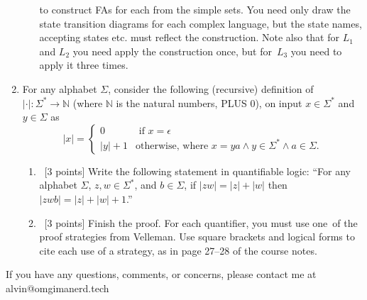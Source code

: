 \documentclass[letterpaper, 12pt]{math}
\begin{document}
\begin{enumerate}
\begin{enumerate}
    to construct FAs for each from the simple sets. You need only draw the
    state transition diagrams for each complex language, but the state names,
    accepting states etc. must reflect the construction. Note also that for
    \( L_1 \) and \( L_2 \) you need apply the construction once, but for\
    \( L_3 \) you need to apply it three times.
  \end{enumerate}
  \item For any alphabet $\Sigma$, consider the following (recursive)
  definition of $|\cdot|: \Sigma^* \rightarrow \mathbb{N}$ (where $\mathbb{N}$
  is the natural numbers, PLUS \( 0 \)), on input $x \in \Sigma^*$ and $y \in
  \Sigma$ as
  \[ |x| = \left\{\begin{array}{ll} 0 & \mbox{ if } x = \epsilon \\
    |y| + 1 & \mbox{otherwise, where } x=ya \wedge y \in \Sigma^* \wedge a \in
    \Sigma.\end{array}\right. \]
  \begin{enumerate}
    \item ~[3 points] Write the following statement in quantifiable logic:
    ``For any alphabet $\Sigma$, $z,w \in \Sigma^*$, and $b \in \Sigma$, if
    $|zw| = |z| + |w|$ then $|zwb| = |z| + |w| + 1$.''
    \item ~[3 points] Finish the proof. For each quantifier, you must use one\
    of the proof strategies from Velleman. Use square brackets and logical
    forms to cite each use of a strategy, as in page 27--28 of the course notes.
  \end{enumerate}
\end{enumerate}

\begin{center}
  If you have any questions, comments, or concerns, please contact me at
  alvin@omgimanerd.tech
\end{center}
\end{document}
